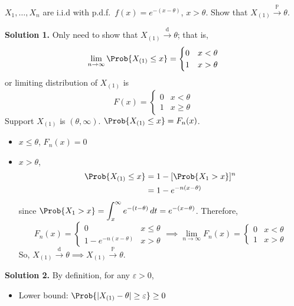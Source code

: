 \begin{Example}{}{}
    $ X_1,\ldots,X_n $ are i.i.d with p.d.f.\
    $ f(x)=e^{-(x-\theta)} $, $ x>\theta $. Show that
    $ X_{(1)}\stackrel{\mathbb{P}}{\to}\theta $.

    \textbf{Solution 1.} Only need to show that $ X_{(1)}\stackrel{\text{d}}{\to}\theta $;
    that is,
    \[ \lim\limits_{{n} \to {\infty}} \Prob{X_{(1)}\le x}
        =\begin{cases}
            0 & x<\theta \\
            1 & x>\theta
        \end{cases} \]
    or limiting distribution of $ X_{(1)} $ is
    \[ F(x)=\begin{cases}
            0 & x< \theta   \\
            1 & x\ge \theta
        \end{cases} \]
    Support $ X_{(1)} $ is $ (\theta,\infty) $.
    $ \Prob{X_{(1)}\le x}=F_n(x) $.
    \begin{itemize}
        \item $ x\le \theta $, $ F_n(x)=0 $
        \item $ x>\theta $,
              \begin{align*}
                  \Prob{X_{(1)}\le x}
                   & =1-[\Prob{X_1>x}]^n \\
                   & =1-e^{-n(x-\theta)}
              \end{align*}
              since
              $ \displaystyle  \Prob{X_1>x}=\int_{x}^{\infty} e^{-(t-\theta)}\, d{t}=
                  e^{-(x-\theta)}  $. Therefore,
              \[ F_n(x)=\begin{cases}
                      0                  & x\le \theta \\
                      1-e^{-n(x-\theta)} & x>\theta
                  \end{cases}\implies
                  \lim\limits_{{n} \to {\infty}} F_n(x)=
                  \begin{cases}
                      0 & x<\theta \\
                      1 & x>\theta
                  \end{cases} \]
              So, $ X_{(1)}\stackrel{\text{d}}{\to}\theta\implies
                  X_{(1)}\stackrel{\mathbb{P}}{\to}\theta $.
    \end{itemize}
    \textbf{Solution 2.} By definition, for any $ \varepsilon>0 $,
    \begin{itemize}
        \item Lower bound: $ \Prob{\abs{X_{(1)}-\theta}\ge \varepsilon}\ge 0 $

\end{itemize}
\end{Example}
